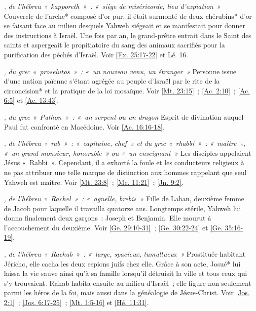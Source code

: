 \begin{multicols}{2}
\textit{, de l'hébreu «~kapporeth~»~: «~siège de miséricorde, lieu d'expiation~»}\newline
Couvercle de l'arche* composé d'or pur, il était surmonté de deux chérubins* d'or se faisant face au milieu desquels Yahweh siégeait et se manifestait pour donner des instructions à Israël. Une fois par an, le grand-prêtre entrait dans le Saint des saints et aspergeait le propitiatoire du sang des animaux sacrifiés pour la purification des péchés d'Israël. Voir \vref{Ex. 25:17-22} et Lé. 16.

\textit{, du grec «~proselutos~»~: «~un nouveau venu, un étranger~»}\newline
Personne issue d'une nation païenne s'étant agrégée au peuple d'Israël par le rite de la circoncision* et la pratique de la loi mosaïque. Voir \vref{Mt. 23:15}~; \vref{Ac. 2:10}~; \vref{Ac. 6:5} et \vref{Ac. 13:43}.

\textit{, du grec «~Puthon~»~: «~un serpent ou un dragon}\newline
Esprit de divination auquel Paul fut confronté en Macédoine. Voir \vref{Ac. 16:16-18}.

\textit{, de l'hébreu «~rab~»~: «~capitaine, chef~» et du grec «~rhabbi~»~: «~maître~», «~un grand monsieur, honorable~» ou «~un enseignant~»}\newline
Les disciples appelaient Jésus «~Rabbi~». Cependant, il a exhorté la foule et les conducteurs religieux à ne pas attribuer une telle marque de distinction aux hommes rappelant que seul Yahweh est maître. Voir \vref{Mt. 23:8}~; \vref{Mc. 11:21}~; \vref{Jn. 9:2}.

\textit{, de l'hébreu «~Rachel~»~: «~agnelle, brebis~»}\newline
Fille de Laban, deuxième femme de Jacob pour laquelle il travailla quatorze ans. Longtemps stérile, Yahweh lui donna finalement deux garçons~: Joseph et Benjamin. Elle mourut à l'accouchement du deuxième. Voir \vref{Ge. 29:10-31}~; \vref{Ge. 30:22-24} et \vref{Ge. 35:16-19}.

\textit{, de l'hébreu «~Rachab~»~: «~large, spacieux, tumultueux~»}\newline
Prostituée habitant Jéricho, elle cacha les deux espions juifs chez elle. Grâce à son acte, Josué* lui laissa la vie sauve ainsi qu'à sa famille lorsqu'il détruisit la ville et tous ceux qui s'y trouvaient. Rahab habita ensuite au milieu d'Israël~; elle figure non seulement parmi les héros de la foi, mais aussi dans la généalogie de Jésus-Christ. Voir \vref{Jos. 2:1}~; \vref{Jos. 6:17-25}~; \vref{Mt. 1:5-16} et \vref{Hé. 11:31}.


\end{multicols}
